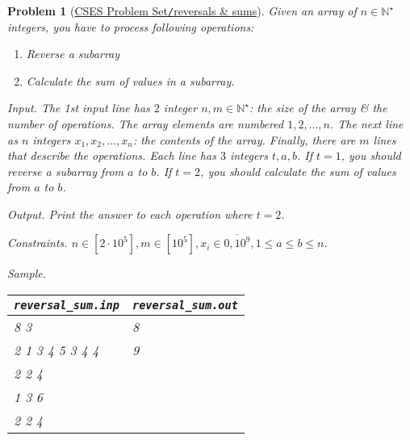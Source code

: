 \documentclass{article}
\newtheorem{problem}{Problem}
\begin{document}
\begin{problem}[\href{https://cses.fi/problemset/task/2074}{CSES Problem Set{\tt/}reversals \& sums}]
    Given an array of $n\in\mathbb{N}^\star$ integers, you have to process following operations:
    \begin{enumerate}
        \item Reverse a subarray
        \item Calculate the sum of values in a subarray.
    \end{enumerate}
    \item {\sf Input.} The 1st input line has $2$ integer $n,m\in\mathbb{N}^\star$: the size of the array \& the number of operations. The array elements are numbered $1,2,\ldots,n$. The next line as $n$ integers $x_1,x_2,\ldots,x_n$: the contents of the array. Finally, there are $m$ lines that describe the operations. Each line has $3$ integers $t,a,b$. If $t = 1$, you should reverse a subarray from $a$ to $b$. If $t = 2$, you should calculate the sum of values from $a$ to $b$.
    \item {\sf Output.} Print the answer to each operation where $t = 2$.
    \item {\sf Constraints.} $n\in[2\cdot10^5],m\in[10^5],x_i\in\overline{0,10^9},1\le a\le b\le n$.
    \item {\sf Sample.}
    \begin{table}[H]
        \centering
        \begin{tabular}{|l|l|}
            \hline
            \verb|reversal_sum.inp| & \verb|reversal_sum.out| \\
            \hline
            8 3 & 8 \\
            2 1 3 4 5 3 4 4 & 9 \\
            2 2 4 & \\
            1 3 6 & \\
            2 2 4 & \\
            \hline
        \end{tabular}
    \end{table}
\end{problem}
\end{document}

